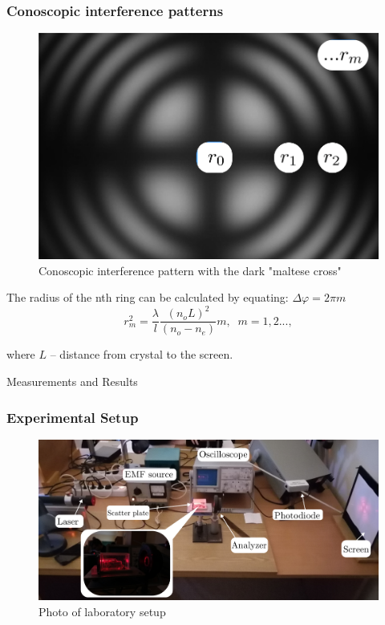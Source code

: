 \documentclass{beamer}
\begin{document}
	\begin{frame}
		\frametitle{Conoscopic interference patterns}
		
		\begin{figure}
			\centering
			\includegraphics[width=0.5\linewidth]{res/pattern}
			\caption{Conoscopic interference pattern with the dark "maltese cross"}
		\end{figure}
		
		\footnotesize
		The radius of the nth ring can be calculated by equating: $\Delta \varphi = 2 \pi m$
		$$r^2_m = \frac{\lambda}{l} \frac{(n_o L)^2}{(n_o - n_e)} m,\;\; m = 1,2...,$$
		
		where $L$ -- distance from crystal to the screen.
	\end{frame}
		
	\begin{frame}[plain,c]	
		\begin{center}
			\huge {} Measurements and Results
		\end{center}
	\end{frame}	
	
	\begin{frame}
		\frametitle{Experimental Setup}
		
		\begin{figure}
			\centering
			\includegraphics[width=1\linewidth]{res/setup.png}
			\caption{Photo of laboratory setup}
		\end{figure}
	\end{frame}
	
\end{document}
